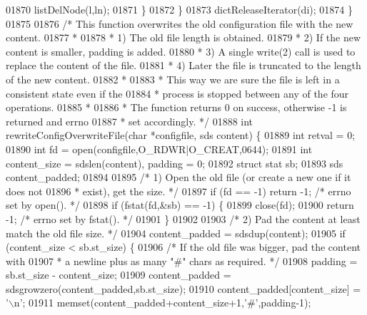\begin{DoxyCode}
{{{{{{{{{{{{{{{{{{{{{{{{{{{{01870             listDelNode(l,ln);
01871         \}
01872     \}
01873     dictReleaseIterator(di);
01874 \}
01875 
01876 \textcolor{comment}{/* This function overwrites the old configuration file with the new content.}
01877 \textcolor{comment}{ *}
01878 \textcolor{comment}{ * 1) The old file length is obtained.}
01879 \textcolor{comment}{ * 2) If the new content is smaller, padding is added.}
01880 \textcolor{comment}{ * 3) A single write(2) call is used to replace the content of the file.}
01881 \textcolor{comment}{ * 4) Later the file is truncated to the length of the new content.}
01882 \textcolor{comment}{ *}
01883 \textcolor{comment}{ * This way we are sure the file is left in a consistent state even if the}
01884 \textcolor{comment}{ * process is stopped between any of the four operations.}
01885 \textcolor{comment}{ *}
01886 \textcolor{comment}{ * The function returns 0 on success, otherwise -1 is returned and errno}
01887 \textcolor{comment}{ * set accordingly. */}
01888 \textcolor{keywordtype}{int} rewriteConfigOverwriteFile(\textcolor{keywordtype}{char} *configfile, sds content) \{
01889     \textcolor{keywordtype}{int} retval = 0;
01890     \textcolor{keywordtype}{int} fd = open(configfile,O\_RDWR|O\_CREAT,0644);
01891     \textcolor{keywordtype}{int} content\_size = sdslen(content), padding = 0;
01892     \textcolor{keyword}{struct} stat sb;
01893     sds content\_padded;
01894 
01895     \textcolor{comment}{/* 1) Open the old file (or create a new one if it does not}
01896 \textcolor{comment}{     *    exist), get the size. */}
01897     \textcolor{keywordflow}{if} (fd == -1) \textcolor{keywordflow}{return} -1; \textcolor{comment}{/* errno set by open(). */}
01898     \textcolor{keywordflow}{if} (fstat(fd,&sb) == -1) \{
01899         close(fd);
01900         \textcolor{keywordflow}{return} -1; \textcolor{comment}{/* errno set by fstat(). */}
01901     \}
01902 
01903     \textcolor{comment}{/* 2) Pad the content at least match the old file size. */}
01904     content\_padded = sdsdup(content);
01905     \textcolor{keywordflow}{if} (content\_size < sb.st\_size) \{
01906         \textcolor{comment}{/* If the old file was bigger, pad the content with}
01907 \textcolor{comment}{         * a newline plus as many "#" chars as required. */}
01908         padding = sb.st\_size - content\_size;
01909         content\_padded = sdsgrowzero(content\_padded,sb.st\_size);
01910         content\_padded[content\_size] = \textcolor{stringliteral}{'\(\backslash\)n'};
01911         memset(content\_padded+content\_size+1,\textcolor{stringliteral}{'#'},padding-1);
}}}}}}}}}}}}}}}}}}}}}}}}}}}}
\end{DoxyCode}
